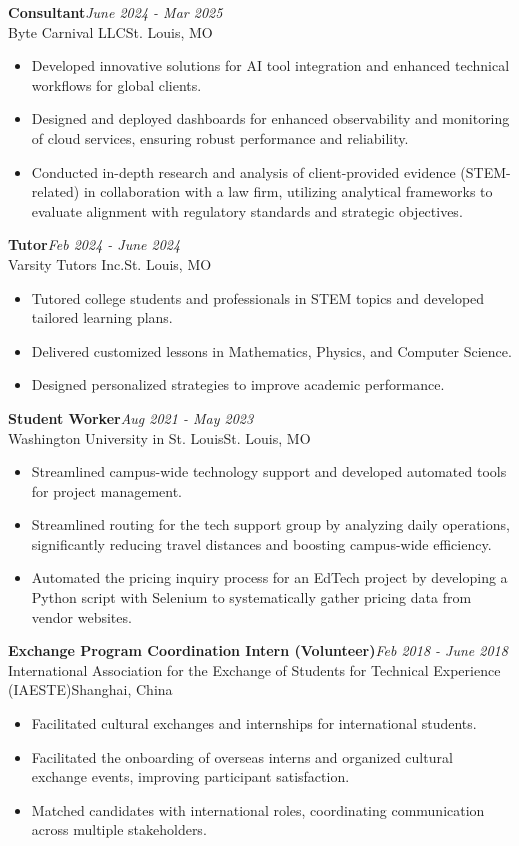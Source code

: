 \documentclass[letterpaper,10pt]{article}
\newcommand{\entry}[4]{%
  \textbf{#1}\hfill\textit{#2}\\
  #3\hfill #4\par}
\begin{document}
\entry{Consultant}{June 2024 - Mar 2025}
  {Byte Carnival LLC}{St. Louis, MO}
\begin{itemize}
  \item Developed innovative solutions for AI tool integration and enhanced technical workflows for global clients.
  \item Designed and deployed dashboards for enhanced observability and monitoring of cloud services, ensuring robust performance and reliability.
  \item Conducted in-depth research and analysis of client-provided evidence (STEM-related) in collaboration with a law firm, utilizing analytical frameworks to evaluate alignment with regulatory standards and strategic objectives.
\end{itemize}

\entry{Tutor}{Feb 2024 - June 2024}
  {Varsity Tutors Inc.}{St. Louis, MO}
\begin{itemize}
  \item Tutored college students and professionals in STEM topics and developed tailored learning plans.
  \item Delivered customized lessons in Mathematics, Physics, and Computer Science.
  \item Designed personalized strategies to improve academic performance.
\end{itemize}

\entry{Student Worker}{Aug 2021 - May 2023}
  {Washington University in St. Louis}{St. Louis, MO}
\begin{itemize}
  \item Streamlined campus-wide technology support and developed automated tools for project management.
  \item Streamlined routing for the tech support group by analyzing daily operations, significantly reducing travel distances and boosting campus-wide efficiency.
  \item Automated the pricing inquiry process for an EdTech project by developing a Python script with Selenium to systematically gather pricing data from vendor websites.
\end{itemize}

\entry{Exchange Program Coordination Intern (Volunteer)}{Feb 2018 - June 2018}
  {International Association for the Exchange of Students for Technical Experience (IAESTE)}{Shanghai, China}
\begin{itemize}
  \item Facilitated cultural exchanges and internships for international students.
  \item Facilitated the onboarding of overseas interns and organized cultural exchange events, improving participant satisfaction.
  \item Matched candidates with international roles, coordinating communication across multiple stakeholders.
\end{itemize}
\end{document}
